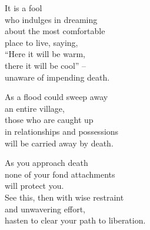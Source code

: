 It is a fool\\
who indulges in dreaming\\
about the most comfortable\\
place to live, saying,\\
“Here it will be warm,\\
there it will be cool” --\\
unaware of impending death.


As a flood could sweep away\\
an entire village,\\
those who are caught up\\
in relationships and possessions\\
will be carried away by death.


As you approach death\\
none of your fond attachments\\
will protect you.\\
See this, then with wise restraint\\
and unwavering effort,\\
hasten to clear your path to liberation.

